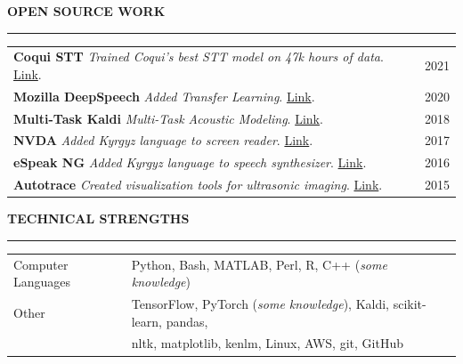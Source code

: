\documentclass{resume} %
\begin{document}
\vspace{.5cm}
\sectionskip
\MakeUppercase{\textbf{Open Source Work}}
  \sectionlineskip
  \hrule
\vspace{.5cm}

\renewcommand{\arraystretch}{1.5} %
\begin{tabular}{@{}p{}p{}@{}}
  {\textbf{Coqui STT}} {\hfill \textit{Trained Coqui's best STT model on 47k hours of data}}.   \href{https://github.com/coqui-ai/STT/releases/tag/v1.0.0}{Link}.
  &
  \hfill 2021
  \\
  {\textbf{Mozilla DeepSpeech}} {\hfill \textit{Added Transfer Learning}}.  \href{https://github.com/mozilla/DeepSpeech/releases/tag/v0.7.0}{Link}.
  &
  \hfill 2020
  \\
  {\textbf{Multi-Task Kaldi}} {\hfill \textit{Multi-Task Acoustic Modeling}}.  \href{https://github.com/JRMeyer/multi-task-kaldi}{Link}.
  &
  \hfill 2018
  \\
  {\textbf{NVDA}} {\hfill \textit{Added Kyrgyz language to screen reader}}.  \href{https://github.com/JRMeyer/nvda}{Link}.
  &
  \hfill 2017
  \\
  {\textbf{eSpeak NG}} {\hfill \textit{Added Kyrgyz language to speech synthesizer}}.  \href{https://github.com/rhdunn/espeak/commits?author=JRMeyer}{Link}.
  &
  \hfill 2016
  \\
  {\textbf{Autotrace}} {\hfill \textit{Created visualization tools for ultrasonic imaging}}.  \href{https://github.com/JRMeyer/Autotrace}{Link}.
  &
  \hfill 2015
\end{tabular}










\vspace{.5cm}
\sectionskip
\MakeUppercase{\textbf{Technical Strengths}}
  \sectionlineskip
  \hrule
\vspace{.5cm}

\begin{tabular}{ll}
Computer Languages & Python, Bash, MATLAB, Perl, R, C++ (\textit{some knowledge}) \\
Other & TensorFlow, PyTorch (\textit{some knowledge}), Kaldi, scikit-learn, pandas,\\
& nltk, matplotlib, kenlm, Linux, AWS, git, GitHub \\
\end{tabular}
\end{document}
